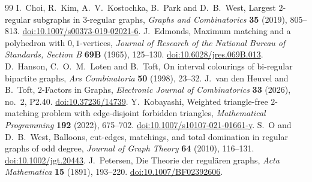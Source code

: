 \documentclass[10pt,a4paper]{amsart}
\begin{document}
\begin{thebibliography}{99}
 I.~Choi, R.~Kim, A.~V.~Kostochka, B.~Park and D.~B.~West, Largest $2$-regular subgraphs in $3$-regular graphs, \emph{Graphs and Combinatorics} \textbf{35} (2019), 805--813. \href{https://doi.org/10.1007/s00373-019-02021-6}{doi:10.1007/s00373-019-02021-6}.
 J.~Edmonds, Maximum matching and a polyhedron with $0,1$-vertices, \emph{Journal of Research of the National Bureau of Standards, Section B} \textbf{69B} (1965), 125--130. \href{https://doi.org/10.6028/jres.069B.013}{doi:10.6028/jres.069B.013}.
 D.~Hanson, C.~O.~M.~Loten and B.~Toft, On interval colourings of bi-regular bipartite graphs, \emph{Ars Combinatoria} \textbf{50} (1998), 23--32.
 J.~van den Heuvel and B.~Toft, $2$-Factors in Graphs, \emph{Electronic Journal of Combinatorics} \textbf{33} (2026), no.~2, P2.40. \href{https://doi.org/10.37236/14739}{doi:10.37236/14739}.
 Y.~Kobayashi, Weighted triangle-free $2$-matching problem with edge-disjoint forbidden triangles, \emph{Mathematical Programming} \textbf{192} (2022), 675--702. \href{https://doi.org/10.1007/s10107-021-01661-y}{doi:10.1007/s10107-021-01661-y}.
 S.~O and D.~B.~West, Balloons, cut-edges, matchings, and total domination in regular graphs of odd degree, \emph{Journal of Graph Theory} \textbf{64} (2010), 116--131. \href{https://doi.org/10.1002/jgt.20443}{doi:10.1002/jgt.20443}.
 J.~Petersen, Die Theorie der regul\"aren graphs, \emph{Acta Mathematica} \textbf{15} (1891), 193--220. \href{https://doi.org/10.1007/BF02392606}{doi:10.1007/BF02392606}.
\end{thebibliography}
\end{document}
